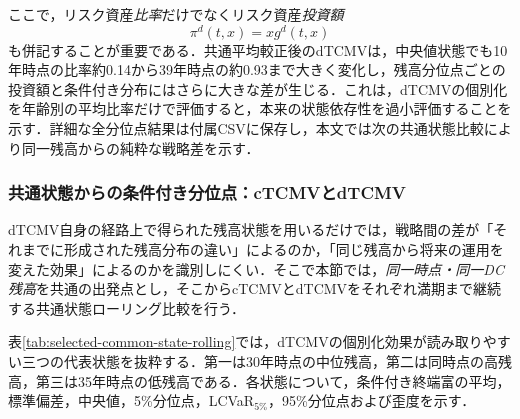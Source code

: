 \documentclass[10pt,a4paper]{article}
\theoremstyle{plain}
\theoremstyle{definition}
\begin{document}
ここで，リスク資産\emph{比率}だけでなくリスク資産\emph{投資額}
\[
  \pi^d(t,x)=x g^d(t,x)
\]
も併記することが重要である．共通平均較正後のdTCMVは，中央値状態でも10年時点の比率約0.14から39年時点の約0.93まで大きく変化し，残高分位点ごとの投資額と条件付き分布にはさらに大きな差が生じる．これは，dTCMVの個別化を年齢別の平均比率だけで評価すると，本来の状態依存性を過小評価することを示す．詳細な全分位点結果は付属CSVに保存し，本文では次の共通状態比較により同一残高からの純粋な戦略差を示す．

\subsubsection{共通状態からの条件付き分位点：cTCMVとdTCMV}
\label{sec:dtcmv-common-state}

dTCMV自身の経路上で得られた残高状態を用いるだけでは，戦略間の差が「それまでに形成された残高分布の違い」によるのか，「同じ残高から将来の運用を変えた効果」によるのかを識別しにくい．そこで本節では，\emph{同一時点・同一DC残高}を共通の出発点とし，そこからcTCMVとdTCMVをそれぞれ満期まで継続する共通状態ローリング比較を行う．

表\ref{tab:selected-common-state-rolling}では，dTCMVの個別化効果が読み取りやすい三つの代表状態を抜粋する．第一は30年時点の中位残高，第二は同時点の高残高，第三は35年時点の低残高である．各状態について，条件付き終端富の平均，標準偏差，中央値，5\%分位点，LCVaR$_{5\%}$，95\%分位点および歪度を示す．

\begin{table}[H]
\centering
\scriptsize
\caption{共通平均較正における共通状態からの条件付き分位点：cTCMVとdTCMV}
\label{tab:selected-common-state-rolling}
\end{table}
\end{document}
